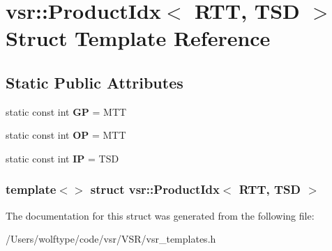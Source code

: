 \hypertarget{structvsr_1_1_product_idx_3_01_r_t_t_00_01_t_s_d_01_4}{\section{vsr\-:\-:Product\-Idx$<$ R\-T\-T, T\-S\-D $>$ Struct Template Reference}
\label{structvsr_1_1_product_idx_3_01_r_t_t_00_01_t_s_d_01_4}
}
\subsection*{Static Public Attributes}
\begin{DoxyCompactItemize}
\item 
\hypertarget{structvsr_1_1_product_idx_3_01_r_t_t_00_01_t_s_d_01_4_a94c402d53a7359d29630a70efa914a28}{static const int {\bfseries G\-P} = M\-T\-T}\label{structvsr_1_1_product_idx_3_01_r_t_t_00_01_t_s_d_01_4_a94c402d53a7359d29630a70efa914a28}

\item 
\hypertarget{structvsr_1_1_product_idx_3_01_r_t_t_00_01_t_s_d_01_4_ab2bf89d085d9d8b0836fc0d669ecc690}{static const int {\bfseries O\-P} = M\-T\-T}\label{structvsr_1_1_product_idx_3_01_r_t_t_00_01_t_s_d_01_4_ab2bf89d085d9d8b0836fc0d669ecc690}

\item 
\hypertarget{structvsr_1_1_product_idx_3_01_r_t_t_00_01_t_s_d_01_4_acdf0ee948069501e7dd1165c0bb91f62}{static const int {\bfseries I\-P} = T\-S\-D}\label{structvsr_1_1_product_idx_3_01_r_t_t_00_01_t_s_d_01_4_acdf0ee948069501e7dd1165c0bb91f62}

\end{DoxyCompactItemize}
\subsubsection*{template$<$$>$ struct vsr\-::\-Product\-Idx$<$ R\-T\-T, T\-S\-D $>$}



The documentation for this struct was generated from the following file\-:\begin{DoxyCompactItemize}
\item 
/\-Users/wolftype/code/vsr/\-V\-S\-R/vsr\-\_\-templates.\-h\end{DoxyCompactItemize}
